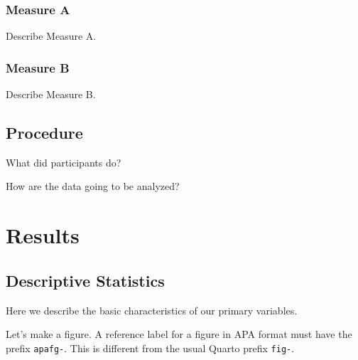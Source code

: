 \documentclass[
  man,
  floatsintext,
  colorlinks=true,linkcolor=blue,citecolor=blue,urlcolor=blue,biblatex]{apa7}
\begin{document}
\hypertarget{measure-a}{%
\subsubsection{Measure A}\label{measure-a}}

Describe Measure A.

\hypertarget{measure-b}{%
\subsubsection{Measure B}\label{measure-b}}

Describe Measure B.

\hypertarget{procedure}{%
\subsection{Procedure}\label{procedure}}

What did participants do?

How are the data going to be analyzed?

\hypertarget{results}{%
\section{Results}\label{results}}

\hypertarget{descriptive-statistics}{%
\subsection{Descriptive Statistics}\label{descriptive-statistics}}

Here we describe the basic characteristics of our primary variables.

Let's make a figure. A reference label for a figure in APA format must
have the prefix \texttt{apafg-}. This is different from the usual Quarto
prefix \texttt{fig-}.
\end{document}
